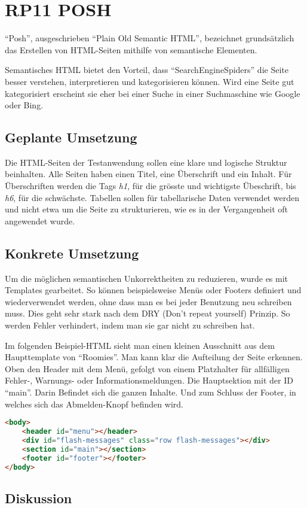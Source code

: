 \section{RP11 POSH}
\label{sec:principle-rp11-posh}

``Posh'', ausgeschrieben ``Plain Old Semantic HTML'', bezeichnet grundsätzlich das Erstellen von HTML-Seiten mithilfe von semantische Elementen. \cite{SemanticHTML}

Semantisches HTML bietet den Vorteil, dass ``\glspl{SearchEngineSpider}'' die Seite besser verstehen, interpretieren und kategorisieren können. Wird eine Seite gut kategorisiert erscheint sie eher bei einer Suche in einer Suchmaschine wie Google oder Bing.

\subsection*{Geplante Umsetzung}
Die HTML-Seiten der Testanwendung sollen eine klare und logische Struktur beinhalten.
Alle Seiten haben einen Titel, eine Überschrift und ein Inhalt.
Für Überschriften werden die Tags \emph{h1}, für die grösste und wichtigste Übeschrift, bis \emph{h6}, für die schwächste.
Tabellen sollen für tabellarische Daten verwendet werden und nicht etwa um die Seite zu strukturieren, wie es in der Vergangenheit oft angewendet wurde.

\subsection*{Konkrete Umsetzung}
Um die möglichen semantischen Unkorrektheiten zu reduzieren, wurde es mit Templates gearbeitet. So können beispielsweise Menüs oder Footers definiert und wiederverwendet werden, ohne dass man es bei jeder Benutzung neu schreiben muss. Dies geht sehr stark nach dem DRY (Don't repeat yourself) Prinzip. So werden Fehler verhindert, indem man sie gar nicht zu schreiben hat.

Im folgenden Beispiel-HTML sieht man einen kleinen Ausschnitt aus dem Haupttemplate von ``Roomies''. Man kann klar die Aufteilung der Seite erkennen. Oben den Header mit dem Menü, gefolgt von einem Platzhalter für allfälligen Fehler-, Warnungs- oder Informationsmeldungen. Die Hauptsektion mit der ID ``main''. Darin Befindet sich die ganzen Inhalte. Und zum Schluss der Footer, in welches sich das Abmelden-Knopf befinden wird.

\begin{lstlisting}[language=HTML, caption=Layout Definition \cite{roomiesHtmlSkeleton}, label=lst:layoutDefinition, firstnumber=27]
<body>
	<header id="menu"></header>
	<div id="flash-messages" class="row flash-messages"></div>
	<section id="main"></section>
	<footer id="footer"></footer>
</body>
\end{lstlisting}

\subsection*{Diskussion}
